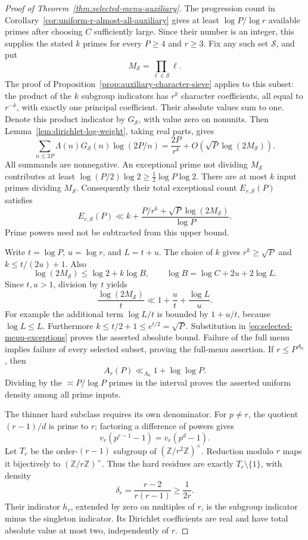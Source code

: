 \documentclass[11pt]{article}
\theoremstyle{definition}
\theoremstyle{remark}
\begin{document}
\begin{proof}[Proof of Theorem~\ref{thm:selected-menu-auxiliary}]
The progression count in
Corollary~\ref{cor:uniform-r-almost-all-auxiliary} gives at least
\(\log P/\log r\) available primes after choosing \(C\) sufficiently
large. Since their number is an integer, this supplies the stated
\(k\) primes for every \(P\ge4\) and \(r\ge3\).
Fix any such set \(\mathcal S\), and put
\[
 M_{\mathcal S}=\prod_{\ell\in\mathcal S}\ell.
\]
The proof of Proposition~\ref{prop:auxiliary-character-sieve}
applies to this subset: the product of the \(k\) subgroup
indicators has \(r^k\) character coefficients, all equal to
\(r^{-k}\), with exactly one principal coefficient.
Their absolute values sum to one. Denote this product indicator
by \(G_{\mathcal S}\), with value zero on nonunits. Then
Lemma~\ref{lem:dirichlet-log-weight}, taking real parts, gives
\[
 \sum_{n\le2P}\Lambda(n)G_{\mathcal S}(n)\log(2P/n)
 =\frac{2P}{r^k}
       +O\!\left(\sqrt P\log(2M_{\mathcal S})\right).
\]
All summands are nonnegative. An exceptional prime not dividing
\(M_{\mathcal S}\) contributes at least
\(\log(P/2)\log2\ge\tfrac12\log P\log2\).
There are at most \(k\) input primes dividing \(M_{\mathcal S}\).
Consequently their total exceptional count \(E_{r,\mathcal S}(P)\)
satisfies
\begin{equation}\label{eq:selected-menu-exceptions}
 E_{r,\mathcal S}(P)\ll
 k+\frac{P/r^k+\sqrt P\log(2M_{\mathcal S})}{\log P}.
\end{equation}
Prime powers need not be subtracted from this upper bound.

Write \(t=\log P\), \(u=\log r\), and \(L=t+u\).
The choice of \(k\) gives \(r^k\ge\sqrt P\) and
\(k\le t/(2u)+1\). Also
\[
 \log(2M_{\mathcal S})\le\log2+k\log B,\qquad
 \log B=\log C+2u+2\log L.
\]
Since \(t,u>1\), division by \(t\) yields
\[
 \frac{\log(2M_{\mathcal S})}{t}
 \ll 1+\frac ut+\frac{\log L}{u}.
\]
For example the additional term \(\log L/t\) is bounded by
\(1+u/t\), because \(\log L\le L\).
Furthermore \(k\le t/2+1\le e^{t/2}=\sqrt P\).
Substitution in \eqref{eq:selected-menu-exceptions} proves
the asserted absolute bound. Failure of the full menu implies
failure of every selected subset, proving the full-menu assertion.
If \(r\le P^{A_0}\), then
\[
 A_r(P)\ll_{A_0}1+\log\log P.
\]
Dividing by the \(\asymp P/\log P\) primes in the interval
proves the asserted uniform density among all prime inputs.

The thinner hard subclass requires its own denominator.
For \(p\ne r\), the quotient \((r-1)/d\) is prime to \(r\);
factoring a difference of powers gives
\[
 v_r(p^{r-1}-1)=v_r(p^d-1).
\]
Let \(T_r\) be the order-\((r-1)\) subgroup of
\((\mathbb Z/r^2\mathbb Z)^\times\).
Reduction modulo \(r\) maps it bijectively to
\((\mathbb Z/r\mathbb Z)^\times\). Thus the hard residues
are exactly \(T_r\setminus\{1\}\), with density
\[
 \delta_r=\frac{r-2}{r(r-1)}\ge\frac1{2r}.
\]
Their indicator \(h_r\), extended by zero on multiples of \(r\),
is the subgroup indicator minus the singleton indicator.
Its Dirichlet coefficients are real and have total absolute
value at most two, independently of \(r\).


\end{proof}
\end{document}
